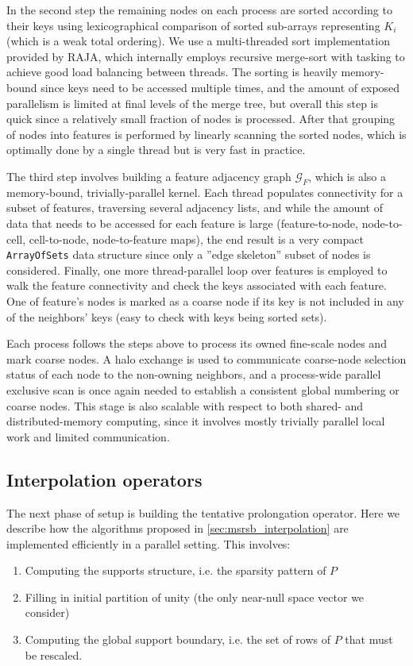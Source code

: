In the second step the remaining nodes on each process are sorted according to their keys using lexicographical comparison of sorted sub-arrays representing $K_i$ (which is a weak total ordering).   We use a multi-threaded sort implementation provided by RAJA, which internally employs recursive merge-sort with tasking to achieve good load balancing between threads.   The sorting is heavily memory-bound since keys need to be accessed multiple times, and the amount of exposed parallelism is limited at final levels of the merge tree, but overall this step is quick since a relatively small fraction of nodes is processed.   After that grouping of nodes into features is performed by linearly scanning the sorted nodes, which is optimally done by a single thread but is very fast in practice.

The third step involves building a feature adjacency graph $\mathcal{G}_F$, which is also a memory-bound, trivially-parallel kernel.   Each thread populates connectivity for a subset of features, traversing several adjacency lists, and while the amount of data that needs to be accessed for each feature is large (feature-to-node, node-to-cell, cell-to-node, node-to-feature maps), the end result is a very compact \texttt{ArrayOfSets} data structure since only a ''edge skeleton'' subset of nodes is considered.   Finally, one more thread-parallel loop over features is employed to walk the feature connectivity and check the keys associated with each feature.   One of feature's nodes is marked as a coarse node if its key is not included in any of the neighbors' keys (easy to check with keys being sorted sets).

Each process follows the steps above to process its owned fine-scale nodes and mark coarse nodes.   A halo exchange is used to communicate coarse-node selection status of each node to the non-owning neighbors, and a process-wide parallel exclusive scan is once again needed to establish a consistent global numbering or coarse nodes.   This stage is also scalable with respect to both shared- and distributed-memory computing, since it involves mostly trivially parallel local work and limited communication.

\subsection{Interpolation operators}
\label{subsec:par_kernels_support}

The next phase of setup is building the tentative prolongation operator.   Here we describe how the algorithms proposed in \cref{sec:msrsb_interpolation} are implemented efficiently in a parallel setting.   This involves:
\begin{enumerate}
    \item Computing the supports structure, i.e. the sparsity pattern of $P$
    \item Filling in initial partition of unity (the only near-null space vector we consider)
    \item Computing the global support boundary, i.e. the set of rows of $P$ that must be rescaled.
\end{enumerate}

